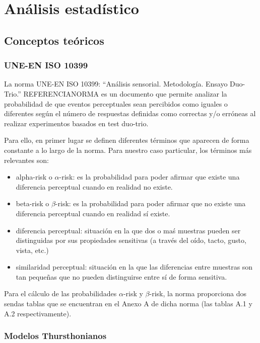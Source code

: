 \documentclass[11pt,a4paper,twoside]{book}
\author{Víctor de Tejada Molera}
\begin{document}
\chapter{Análisis estadístico}    
    \section{Conceptos teóricos}    
        \subsection*{UNE-EN ISO 10399}
            La norma UNE-EN ISO 10399: ``Análisis sensorial. Metodología. Ensayo Duo-Trio.'' REFERENCIANORMA es un documento que permite analizar la probabilidad de que eventos perceptuales sean percibidos como iguales o diferentes según el número de respuestas definidas como correctas y/o erróneas al realizar experimentos basados en test duo-trio.
        
            Para ello, en primer lugar se definen diferentes términos que aparecen de forma constante a lo largo de la norma. Para nuestro caso particular, los términos más relevantes son:
        
            \begin{itemize}
                \item alpha-risk o $\alpha$-risk: es la probabilidad para poder afirmar que existe una diferencia perceptual cuando en realidad no existe.
                \item beta-risk o $\beta$-risk: es la probabilidad para poder afirmar que no existe una diferencia perceptual cuando en realidad sí existe.
                \item diferencia perceptual: situación en la que dos o maś muestras pueden ser distinguidas por sus propiedades sensitivas (a través del oído, tacto, gusto, vista, etc.)
                \item similaridad perceptual: situación en la que las diferencias entre muestras son tan pequeñas que no pueden distinguirse entre sí de forma sensitiva.
            \end{itemize}
            Para el cálculo de las probabilidades $\alpha$-risk y $\beta$-risk, la norma proporciona dos sendas tablas que se encuentran en el Anexo A de dicha norma (las tablas A.1 y A.2 respectivamente).
        \subsection*{Modelos Thursthonianos}
    
\end{document}
